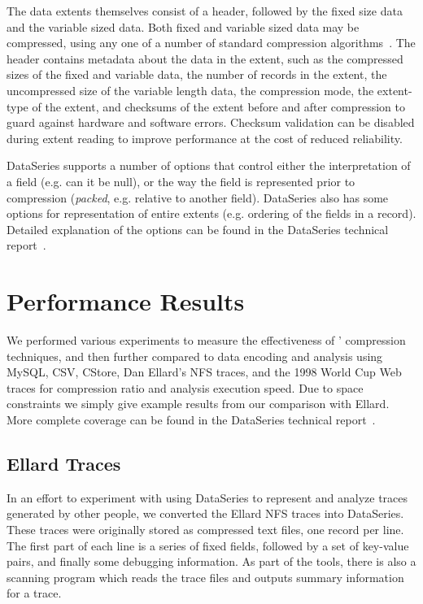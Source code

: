 \documentclass{acm_proc_article-sp}
\begin{document}
The data extents themselves consist of a header, followed by the fixed
size data and the variable sized data.  Both fixed and variable sized
data may be compressed, using any one of a number of standard
compression algorithms~\cite{GZIP,BZIP,LZF,LZO}.  The header contains
metadata about the data in the extent, such as the compressed sizes of
the fixed and variable data, the number of records in the extent, the
uncompressed size of the variable length data, the compression mode,
the extent-type of the extent, and checksums of the extent before and
after compression to guard against hardware and software errors.
Checksum validation can be disabled during extent reading to improve
performance at the cost of reduced reliability.

DataSeries supports a number of options that control either the
interpretation of a field (e.g. can it be null), or the way the field
is represented prior to compression ({\em packed}, e.g. relative to
another field).  DataSeries also has some options for representation
of entire extents (e.g. ordering of the fields in a record).  
Detailed explanation of the options can be found in the DataSeries
technical report~\cite{DSTechnicalReportSnapshot}.

\section{Performance Results}\label{sec:results}

We performed various experiments to measure the effectiveness of
\DataSeries{}' compression techniques, and then further compared
\DataSeries{} to data encoding and analysis using MySQL, CSV, CStore,
Dan Ellard's NFS traces\cite{ellard03}, and the 1998 World Cup Web
traces\cite{ita08} for compression ratio and analysis execution speed.
Due to space constraints we simply give example results from our
comparison with Ellard.  More complete coverage can be found in the
DataSeries technical report~\cite{DSTechnicalReportSnapshot}.


\subsection{Ellard Traces}\label{sec:ellard}

In an effort to experiment with using DataSeries to represent and
analyze traces generated by other people, we converted the Ellard NFS
traces into DataSeries.  These traces
were originally stored as compressed text files, one record per line.
The first part of each line is a series of fixed fields, followed by a
set of key-value pairs, and finally some debugging information.  As
part of the tools, there is also a scanning program which reads the
trace files and outputs summary information for a trace.
\end{document}
